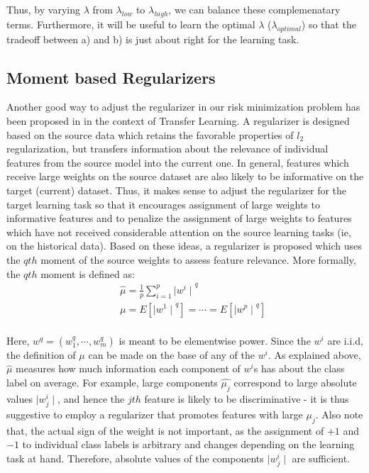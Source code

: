 \documentclass[a4paper]{article}
\begin{document}
\noindent Thus, by varying $\lambda$ from $\lambda_{low}$ to $\lambda_{high}$, we can balance these complemenatary terms. Furthermore, it will be useful to learn the optimal $\lambda$ ($\lambda_{optimal}$) so that the tradeoff between a) and b) is just about right for the learning task.

\subsection{Moment based Regularizers}
Another good way to adjust the regularizer in our risk minimization problem has been proposed in \citep{ruckert2011transfer} in the context of Transfer Learning. A regularizer is designed based on the source data which retains the favorable properties of $l_2$ regularization, but transfers information about the relevance of individual features from the source model into the current one. In general, features which receive large weights on the source dataset are also likely to be informative on the target (current) dataset. Thus, it makes sense to adjust the regularizer for the target learning task so that it encourages assignment of large weights to informative features and to penalize the assignment of large weights to features which have not received considerable attention on the source learning tasks (ie, on the historical data). Based on these ideas, a regularizer is proposed which uses the $qth$ moment of the source weights to assess feature relevance. More formally, the $qth$ moment is defined as: \\

\begin{equation}
\begin{aligned}
& & \hat{\mu} = \frac{1}{p} \sum_{i=1}^{p} {\mid w^i\mid}^q  \\
& & \mu =  E[{\mid w^1\mid}^q] = \cdots = E[{\mid w^p\mid}^q] \\
\end{aligned}
\end{equation}

\noindent Here, $w^q = (w_1^q, \cdots, w_m^q)$ is meant to be elementwise power. Since the $w^i$ are i.i.d, the definition of $\mu$ can be made on the base of any of the $w^i$. As explained above, $\hat{\mu}$ measures how much information each component of $w^i$s has about the class label on average. For example, large components $\hat{\mu_j}$ correspond to large absolute values $\mid w_j^i \mid$, and hence the $jth$ feature is likely to be discriminative - it is thus suggestive to employ a regularizer that promotes features with large $\mu_j$. Also note that, the actual sign of the weight is not important, as the assignment of $+1$ and $-1$ to individual class labels is arbitrary and changes depending on the learning task at hand. Therefore, absolute values of the components $\mid w_j^i \mid$ are sufficient.\\
\end{document}
